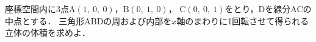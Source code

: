 ﻿\documentclass[../../../uem_mat_tok_q.tex]{subfiles}
\begin{document}
    座標空間内に3点$\mathrm{A}(1,\:0,\:0)$，$\mathrm{B}(0,\:1,\:0)$，%
    $\mathrm{C}(0,\:0,\:1)$をとり，Dを線分ACの中点とする．%
    三角形ABDの周および内部を$x$軸のまわりに1回転させて得られる立体の体積を求めよ．
\end{document}
